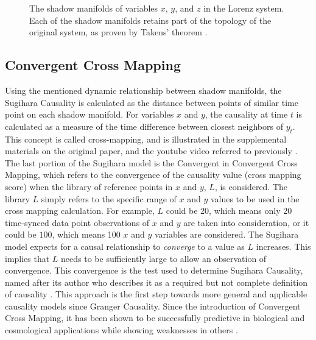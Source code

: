 \begin{figure}
\begin{subfigure}{0.30\textwidth}
	\end{subfigure}
	\caption{The shadow manifolds of variables $x$, $y$, and $z$ in the Lorenz system. Each of the shadow manifolds retains part of the topology of the original system, as proven by Takens' theorem \cite{Takens1981}.}
	\label{fig:lorenz_topology}
\end{figure}

\subsection{Convergent Cross Mapping}
Using the mentioned dynamic relationship between shadow manifolds, the Sugihara Causality is calculated as the distance between points of similar time point on each shadow manifold. For variables $x$ and $y$, the causality at time $t$ is calculated as a measure of the time difference between closest neighbors of $y_t$. This concept is called cross-mapping, and is illustrated in the supplemental materials on the original paper, and the youtube video referred to previously \cite{Sugihara2012, TakensYoutube2012}. The last portion of the Sugihara model is the Convergent in Convergent Cross Mapping, which refers to the convergence of the causality value (cross mapping score) when the library of reference points in $x$ and $y$, $L$, is considered. The library $L$ simply refers to the specific range of $x$ and $y$ values to be used in the cross mapping calculation. For example, $L$ could be 20, which means only 20 time-synced data point observations of $x$ and $y$ are taken into consideration, or it could be $100$, which means 100 $x$ and $y$ variables are considered. The Sugihara model expects for a causal relationship to \textit{converge} to a value as $L$ increases. This implies that $L$ needs to be sufficiently large to allow an observation of convergence. This convergence is the test used to determine Sugihara Causality, named after its author who describes it as a required but not complete definition of causality \cite{Sugihara2012}. This approach is the first step towards more general and applicable causality models since Granger Causality. Since the introduction of Convergent Cross Mapping, it has been shown to be successfully predictive in biological \cite{Deyle16042013,Wang2014,Sugihara2012,Mcbride2015,Nes2015} and cosmological \cite{Tsonis2015} applications while showing weaknesses in others \cite{Mccracken2014}. 

